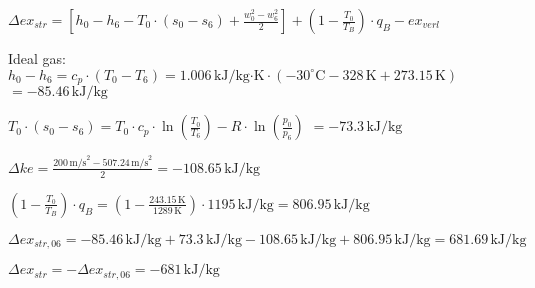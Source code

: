 \( \Delta ex_{str} = [h_0 - h_6 - T_0 \cdot (s_0 - s_6) + \frac{w_0^2 - w_6^2}{2}] + (1 - \frac{T_0}{T_B}) \cdot q_B - ex_{verl} \)  

Ideal gas:  
\( h_0 - h_6 = c_p \cdot (T_0 - T_6) = 1.006 \, \text{kJ/kg·K} \cdot (-30^\circ \text{C} - 328 \, \text{K} + 273.15 \, \text{K}) \)  
\( = -85.46 \, \text{kJ/kg} \)  

\( T_0 \cdot (s_0 - s_6) = T_0 \cdot c_p \cdot \ln(\frac{T_0}{T_6}) - R \cdot \ln(\frac{p_0}{p_6}) \)  
\( = -73.3 \, \text{kJ/kg} \)  

\( \Delta ke = \frac{200 \, \text{m/s}^2 - 507.24 \, \text{m/s}^2}{2} = -108.65 \, \text{kJ/kg} \)  

\( (1 - \frac{T_0}{T_B}) \cdot q_B = (1 - \frac{243.15 \, \text{K}}{1289 \, \text{K}}) \cdot 1195 \, \text{kJ/kg} = 806.95 \, \text{kJ/kg} \)  

\( \Delta ex_{str,06} = -85.46 \, \text{kJ/kg} + 73.3 \, \text{kJ/kg} - 108.65 \, \text{kJ/kg} + 806.95 \, \text{kJ/kg} = 681.69 \, \text{kJ/kg} \)  

\( \Delta ex_{str} = -\Delta ex_{str,06} = -681 \, \text{kJ/kg} \)